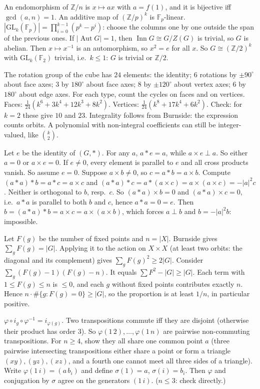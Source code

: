 \documentclass[11pt,a4paper]{article}
\begin{document}
 An endomorphism of $\mathbb Z/n$ is $x\mapsto ax$ with $a=f(1)$, and it is bijective iff $\gcd(a,n)=1$. An additive map of $(\mathbb Z/p)^k$ is $\mathbb F_p$-linear. $|\mathrm{GL}_k(\mathbb F_p)|=\prod_{i=0}^{k-1}(p^k-p^i)$: choose the columns one by one outside the span of the previous ones.
 If $|\operatorname{Aut}G|=1$, then $\operatorname{Inn}G\cong G/Z(G)$ is trivial, so $G$ is abelian. Then $x\mapsto x^{-1}$ is an automorphism, so $x^2=e$ for all $x$.
 So $G\cong(\mathbb Z/2)^k$ with $\mathrm{GL}_k(\mathbb F_2)$ trivial, i.e.\ $k\le1$: $G$ is trivial or $\mathbb Z/2$.

 The rotation group of the cube has $24$ elements: the identity; $6$ rotations by $\pm90^\circ$ about face axes; $3$ by $180^\circ$ about face axes; $8$ by $\pm120^\circ$ about vertex axes; $6$ by $180^\circ$ about edge axes. For each type, count the cycles on faces and on vertices.
 Faces: $\frac1{24}(k^6+3k^4+12k^3+8k^2)$. Vertices: $\frac1{24}(k^8+17k^4+6k^2)$. Check: for $k=2$ these give $10$ and $23$.
 Integrality follows from Burnside: the expression counts orbits. A polynomial with non-integral coefficients can still be integer-valued, like $\binom k2$.

 Let $e$ be the identity of $(G,*)$. For any $a$, $a*e=a$, while $a\times e\perp a$. So either $a=0$ or $a\times e=0$. If $e\ne0$, every element is parallel to $e$ and all cross products vanish. So assume $e=0$.
 Suppose $a\times b\ne0$, so $c=a*b=a\times b$. Compute $(a*a)*b=a*c=a\times c$ and $(a*a)*c=a*(a\times c)=a\times(a\times c)=-|a|^2c$. Neither is orthogonal to $b$, resp.\ $c$.
 So $(a*a)\times b=0$ and $(a*a)\times c=0$, i.e.\ $a*a$ is parallel to both $b$ and $c$, hence $a*a=0=e$. Then $b=(a*a)*b=a\times c=a\times(a\times b)$, which forces $a\perp b$ and $b=-|a|^2b$: impossible.

 Let $F(g)$ be the number of fixed points and $n=|X|$. Burnside gives $\sum_gF(g)=|G|$. Applying it to the action on $X\times X$ (at least two orbits: the diagonal and its complement) gives $\sum_gF(g)^2\ge2|G|$.
 Consider $\sum_g(F(g)-1)(F(g)-n)$. It equals $\sum F^2-|G|\ge|G|$. Each term with $1\le F(g)\le n$ is $\le0$, and each $g$ without fixed points contributes exactly $n$.
 Hence $n\cdot\#\{g:F(g)=0\}\ge|G|$, so the proportion is at least $1/n$, in particular positive.

 $\varphi\circ i_g\circ\varphi^{-1}=i_{\varphi(g)}$.
 Two transpositions commute iff they are disjoint (otherwise their product has order $3$). So $\varphi(1\,2),\dots,\varphi(1\,n)$ are pairwise non-commuting transpositions. For $n\ge4$, show they all share one common point $a$ (three pairwise intersecting transpositions either share a point or form a triangle $(xy),(yz),(xz)$, and a fourth one cannot meet all three sides of a triangle).
 Write $\varphi(1\,i)=(a\,b_i)$ and define $\sigma(1)=a$, $\sigma(i)=b_i$. Then $\varphi$ and conjugation by $\sigma$ agree on the generators $(1\,i)$. ($n\le3$: check directly.)
\end{document}
